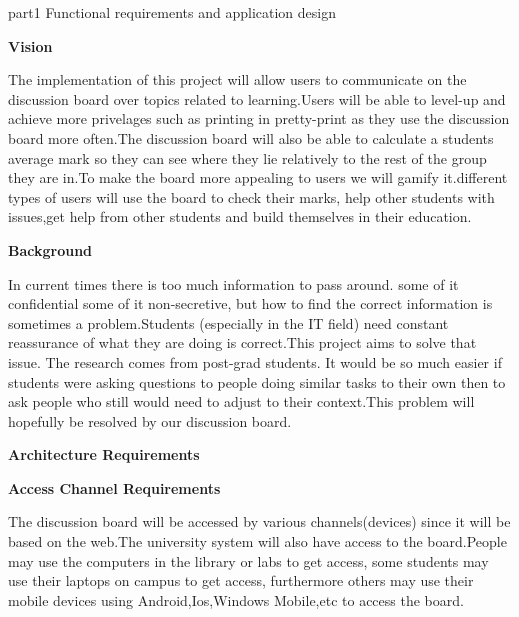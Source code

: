 \documentclass[12pt,a4paper]{article}
\begin{document}
\Huge
part1\linebreak
Functional requirements and application design\linebreak\linebreak\linebreak

\Huge \bf Vision

\small \par The implementation of this project will allow users to communicate on the discussion board over topics related to learning.Users will be able to level-up and achieve more privelages such as printing in pretty-print as they use the discussion board more often.The discussion board will also be able to calculate a students average mark so they can see where they lie relatively to the rest of the group they are in.To make the board more appealing to users we will gamify it.different types of users will use the board to check their marks, help other students with issues,get help from other students and build themselves in their education. \linebreak\linebreak

\Huge\bf Background
\small\sf\par In current times there is too much information to pass around. some of it confidential some of it non-secretive, but how to find the correct information is sometimes a problem.Students (especially in the IT field) need constant reassurance of what they are doing is correct.This project aims to solve that issue. The research comes from post-grad students. It would be so much easier if students were asking questions to people doing similar tasks to their own then to ask people who still would need to adjust to their context.This problem will hopefully be resolved by our discussion board.

\huge\bf Architecture Requirements\par

\large \bf  Access Channel Requirements\par

\small\sf The discussion board will be accessed by various channels(devices) since it will be based on the web.The university system will also have access to the board.People may use the computers in the library or labs to get access, some students may use their laptops on campus to get access, furthermore others may use their mobile devices using Android,Ios,Windows Mobile,etc to access the board. 
\par
\end{document}
